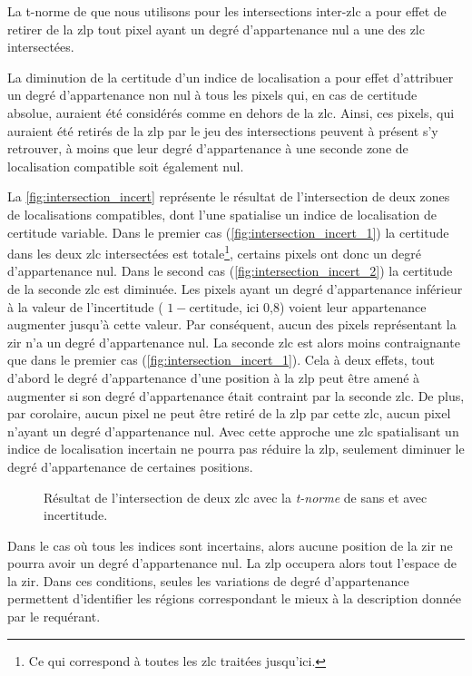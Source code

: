 La t-norme de  que nous utilisons pour les intersections
inter-\ac{zlc} a pour effet de retirer de la \ac{zlp} tout pixel ayant
un degré d'appartenance nul a une des \ac{zlc} intersectées.

La diminution de la certitude d'un indice de localisation a pour effet
d'attribuer un degré d'appartenance non nul à tous les pixels qui, en
cas de certitude absolue, auraient été considérés comme en dehors de
la \ac{zlc}. Ainsi, ces pixels, qui auraient été retirés de la
\ac{zlp} par le jeu des intersections peuvent à présent s'y retrouver,
à moins que leur degré d'appartenance à une seconde zone de
localisation compatible soit également nul.

La \autoref{fig:intersection_incert} représente le résultat de
l'intersection de deux zones de localisations compatibles, dont l'une
spatialise un indice de localisation de certitude variable. Dans le
premier cas (\ref{fig:intersection_incert_1}) la certitude dans les
deux \ac{zlc} intersectées est totale\footnote{Ce qui correspond à
  toutes les \ac{zlc} traitées jusqu'ici.}, certains pixels ont donc
un degré d'appartenance nul.
%
Dans le second cas (\ref{fig:intersection_incert_2}) la certitude de
la seconde \ac{zlc} est diminuée. Les pixels ayant un degré
d'appartenance inférieur à la valeur de l'incertitude (\ie
\(1-\text{certitude}\), ici 0,8) voient leur appartenance augmenter
jusqu'à cette valeur. Par conséquent, aucun des pixels représentant la
\ac{zir} n'a un degré d'appartenance nul. La seconde \ac{zlc} est
alors moins contraignante que dans le premier cas
(\ref{fig:intersection_incert_1}). Cela à deux effets, tout d'abord le
degré d'appartenance d'une position à la \ac{zlp} peut être amené à
augmenter si son degré d'appartenance était contraint par la seconde
\ac{zlc}. De plus, par corolaire, aucun pixel ne peut être retiré de
la \ac{zlp} par cette \ac{zlc}, aucun pixel n'ayant un degré
d'appartenance nul. Avec cette approche une \ac{zlc} spatialisant un
indice de localisation incertain ne pourra pas réduire la \ac{zlp},
seulement diminuer le degré d'appartenance de certaines positions.

\begin{figure}
  \centering  \subfloat[\label{fig:intersection_incert_1}]{}

  \subfloat[\label{fig:intersection_incert_2}]{}
  \caption{Résultat de l'intersection de deux \protect\ac{zlc} avec la
    \emph{t-norme} de  sans
    \protect{} et avec
    \protect{} incertitude.}
  \label{fig:intersection_incert}
\end{figure}

Dans le cas où tous les indices sont incertains, alors aucune position
de la \ac{zir} ne pourra avoir un degré d'appartenance nul. La
\ac{zlp} occupera alors tout l'espace de la \ac{zir}. Dans ces
conditions, seules les variations de degré d'appartenance permettent
d'identifier les régions correspondant le mieux à la description
donnée par le requérant.

